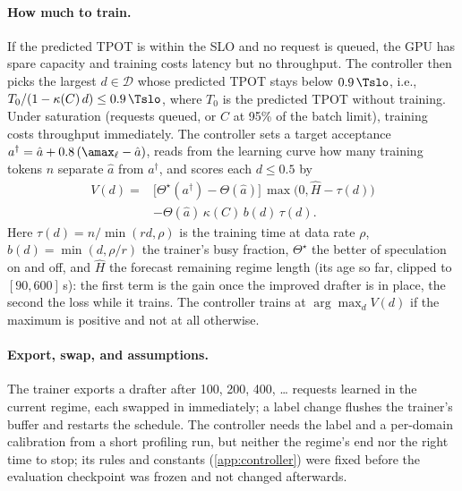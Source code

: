 \paragraph{How much to train.} If the predicted TPOT is within the SLO and no request is queued, the GPU has spare capacity and training costs latency but no throughput. The controller then picks the largest $d\in\mathcal D$ whose predicted TPOT stays below $0.9\,\Tslo$, i.e., $T_0/(1-\kappa(C)\,d)\le0.9\,\Tslo$, where $T_0$ is the predicted TPOT without training. Under saturation (requests queued, or $C$ at 95\% of the batch limit), training costs throughput immediately. The controller sets a target acceptance $a^{\dagger}=\hat a+0.8\,(\amax_\ell-\hat a)$, reads from the learning curve how many training tokens $n$ separate $\hat a$ from $a^{\dagger}$, and scores each $d\le0.5$ by
\begin{equation}
\begin{aligned}
V(d)={}&\big[\Theta^{\star}(a^{\dagger})-\Theta(\hat a)\big]\,\max\!\big(0,\widehat H-\tau(d)\big)\\
&-\Theta(\hat a)\,\kappa(C)\,b(d)\,\tau(d).
\end{aligned}\label{eq:value}
\end{equation}
Here $\tau(d)=n/\min(rd,\rho)$ is the training time at data rate $\rho$, $b(d)=\min(d,\rho/r)$ the trainer's busy fraction, $\Theta^{\star}$ the better of speculation on and off, and $\widehat H$ the forecast remaining regime length (its age so far, clipped to $[90,600]$\,s): the first term is the gain once the improved drafter is in place, the second the loss while it trains. The controller trains at $\arg\max_d V(d)$ if the maximum is positive and not at all otherwise.

\paragraph{Export, swap, and assumptions.} The trainer exports a drafter after 100, 200, 400, \dots{} requests learned in the current regime, each swapped in immediately; a label change flushes the trainer's buffer and restarts the schedule. The controller needs the label and a per-domain calibration from a short profiling run, but neither the regime's end nor the right time to stop; its rules and constants (\cref{app:controller}) were fixed before the evaluation checkpoint was frozen and not changed afterwards.

